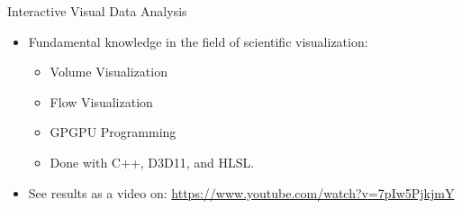 \documentclass{beamer}
\begin{document}
\begin{frame}{Interactive Visual Data Analysis}
	\begin{itemize}
		\item Fundamental knowledge in the field of scientific visualization:
		\begin{itemize}
			\item Volume Visualization
			\item Flow Visualization
			\item GPGPU Programming
			\item Done with C++, D3D11, and HLSL.
		\end{itemize}
		\item See results as a video on: \url{https://www.youtube.com/watch?v=7pIw5PjkjmY}
	\end{itemize}
	\begin{figure}
		\centering
	\end{figure}
\end{frame}
	
\end{document}
